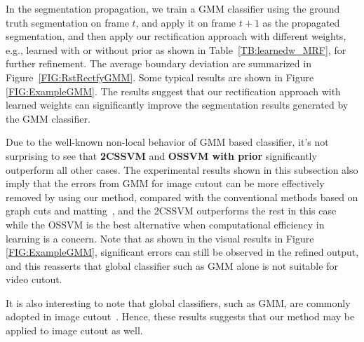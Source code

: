 \documentclass[10pt,journal,compsoc]{newIEEEtran}
\begin{document}
In the segmentation propagation, we train a GMM classifier using the ground truth segmentation on frame $t$, and apply it on frame $t+1$ as the propagated segmentation, and then apply our rectification approach with different weights, e.g., learned with or without prior as shown in Table~\ref{TB:learnedw_MRF}, for further refinement. The average boundary deviation are summarized in Figure~\ref{FIG:RstRectfyGMM}. Some typical results are shown in Figure \ref{FIG:ExampleGMM}. The results suggest that our rectification approach with learned weights can significantly improve the segmentation results generated by the GMM classifier. 

Due to the well-known non-local behavior of GMM based classifier, it's not surprising to see that \textbf{2CSSVM} and \textbf{OSSVM with prior} significantly outperform all other cases. The experimental results shown in this subsection also imply that the errors from GMM for image cutout can be more effectively removed by using our method, compared with the conventional methods based on graph cuts and matting~\cite{Rother04GrabCut,BoykovJolly01GMM-MRF}, and the 2CSSVM outperforms the rest in this case while the OSSVM is the best alternative when computational efficiency in learning is a concern. Note that as shown in the visual results in Figure \ref{FIG:ExampleGMM}, significant errors can still be observed in the refined output, and this reasserts that global classifier such as GMM alone is not suitable for video cutout. 
\iffalse\begin{figure}[!h]
	\centering
	\texttt{[image: imgs/plots/GMM\_plot.jpg]}\\
	\caption{Effectiveness of our data-driven video cutout rectification on GMM classifier.}\label{FIG:RstRectfyGMM}
\end{figure}\fi

It is also interesting to note that global classifiers, such as GMM, are commonly adopted in image cutout~\cite{Rother04GrabCut,BoykovJolly01GMM-MRF}. Hence, these results suggests that our method may be applied to image cutout as well.
\end{document}
